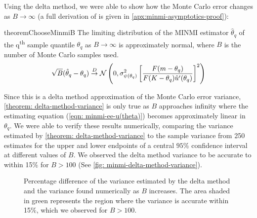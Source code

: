 Using the delta method, we were able to show how the Monte Carlo error changes as $B \rightarrow \infty$ (a full derivation of is given in \autoref{apx:minmi-asymptotics-proof}):
\begin{restatable}{theorem}{ChooseMinmiB}\label{theorem: delta-method-variance}
    The limiting distribution of the MINMI estimator $\hat\theta_q$ of the q\textsuperscript{th} sample quantile $\theta_q$ as $B \rightarrow \infty$ is approximately normal, where $B$ is the number of Monte Carlo samples used.
    \[
        \sqrt{B}(\hat\theta_q - \theta_q) \stackrel{D}{\rightarrow} \mathcal{N} \left(0, \sigma^2_{\psi(\theta_q)} \left[ \frac{F(m-\theta_q)}{F(K-\theta_q)\hat{u}^\prime(\theta_q)} \right]^2 \right)
    \]
\end{restatable}

Since this is a delta method approximation of the Monte Carlo error variance, \autoref{theorem: delta-method-variance} is only true as $B$ approaches infinity where the estimating equation (\autoref{eqn: minmi-ee-u(theta)}) becomes approximately linear in $\theta_q$. We were able to verify these results numerically, comparing the variance estimated by \autoref{theorem: delta-method-variance} to the sample variance from 250 estimates for the upper and lower endpoints of a central $95\%$ confidence interval at different values of $B$. We observed the delta method variance to be accurate to within 15\% for $B > 100$ (See \autoref{fig: minmi-delta-method-variance}).
\begin{figure}[ht]
    \centering
    
    \caption{Percentage difference of the variance estimated by the delta method and the variance found numerically as $B$ increases. The area shaded in green represents the region where the variance is accurate within 15\%, which we observed for $B > 100$.}
    \label{fig: minmi-delta-method-variance}
\end{figure}

